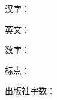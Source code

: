 

\cleardoublepage
\null
汉字：\PublisherHanzi

英文：\PublisherLatin

数字：\PublisherDigit

标点：\PublisherPunct

出版社字数：\PublisherWordCount
\thispagestyle{empty}
\cleardoublepage
\null

